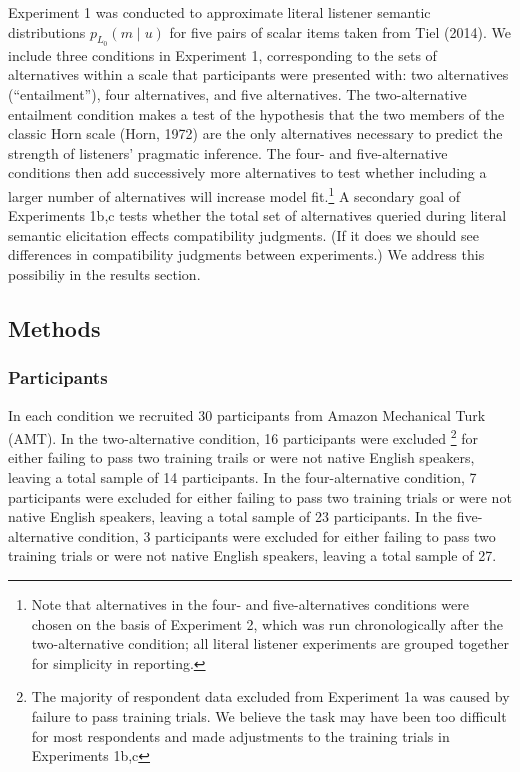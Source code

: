 \documentclass[10pt, letterpaper]{article}
\begin{document}
Experiment 1 was conducted to approximate literal listener semantic
distributions \(p_{L_0}(m \mid u)\) for five pairs of scalar items taken
from Tiel (2014). We include three conditions in Experiment 1,
corresponding to the sets of alternatives within a scale that
participants were presented with: two alternatives (``entailment''),
four alternatives, and five alternatives. The two-alternative entailment
condition makes a test of the hypothesis that the two members of the
classic Horn scale (Horn, 1972) are the only alternatives necessary to
predict the strength of listeners' pragmatic inference. The four- and
five-alternative conditions then add successively more alternatives to
test whether including a larger number of alternatives will increase
model
fit.\footnote{Note that alternatives in the four- and five-alternatives conditions were chosen on the basis of Experiment 2, which was run chronologically after the two-alternative condition; all literal listener experiments are grouped together for simplicity in reporting.}
A secondary goal of Experiments 1b,c tests whether the total set of
alternatives queried during literal semantic elicitation effects
compatibility judgments. (If it does we should see differences in
compatibility judgments between experiments.) We address this possibiliy
in the results section.

\subsection{Methods}\label{methods}

\subsubsection{Participants}\label{participants}

In each condition we recruited 30 participants from Amazon Mechanical
Turk (AMT). In the two-alternative condition, 16 participants were
excluded
\footnote{The majority of respondent data excluded from Experiment 1a was caused by failure to pass training trials. We believe the task may have been too difficult for most respondents and made adjustments to the training trials in Experiments 1b,c}
for either failing to pass two training trails or were not native
English speakers, leaving a total sample of 14 participants. In the
four-alternative condition, 7 participants were excluded for either
failing to pass two training trials or were not native English speakers,
leaving a total sample of 23 participants. In the five-alternative
condition, 3 participants were excluded for either failing to pass two
training trials or were not native English speakers, leaving a total
sample of 27.
\end{document}

